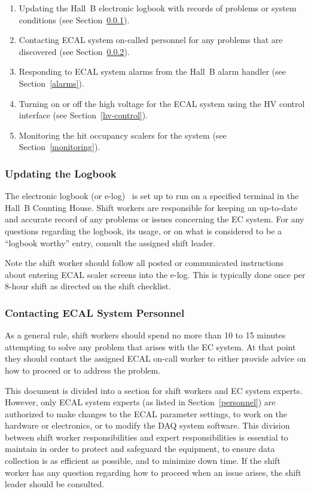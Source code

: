 \documentclass[letterpaper,10pt]{article}
\begin{document}
\begin{enumerate}
\item Updating the Hall~B electronic logbook with records of problems or system conditions (see 
Section~\ref{logbook}).

\item Contacting ECAL system on-called personnel for any problems that are discovered (see 
Section~\ref{contact}).

\item Responding to ECAL system alarms from the Hall~B alarm handler (see Section~\ref{alarms}).

\item Turning on or off the high voltage for the ECAL system using the HV control interface (see 
Section~\ref{hv-control}).

\item Monitoring the hit occupancy scalers for the system (see Section~\ref{monitoring}).
\end{enumerate}

\subsubsection{Updating the Logbook}
\label{logbook}

The electronic logbook (or e-log)~\cite{e-log} is set up to run on a specified terminal in the 
Hall~B Counting House. Shift workers are responsible for keeping an up-to-date and accurate record
of any problems or issues concerning the EC system. For any questions regarding the logbook, its
usage, or on what is considered to be a ``logbook worthy'' entry, consult the assigned shift leader.

Note the shift worker should follow all posted or communicated instructions about entering ECAL
scaler screens into the e-log. This is typically done once per 8-hour shift as directed on the
shift checklist.

\subsubsection{Contacting ECAL System Personnel}
\label{contact}

As a general rule, shift workers should spend no more than 10 to 15 minutes attempting to solve
any problem that arises with the EC system. At that point they should contact the assigned 
ECAL on-call worker to either provide advice on how to proceed or to address the problem.

This document is divided into a section for shift workers and EC system experts. However, only 
ECAL system experts (as listed in Section~\ref{personnel}) are authorized to make changes to the ECAL
parameter settings, to work on the hardware or electronics, or to modify the DAQ system 
software. This division between shift worker responsibilities and expert responsibilities is
essential to maintain in order to protect and safeguard the equipment, to ensure data collection
is as efficient as possible, and to minimize down time. If the shift worker has any question 
regarding how to proceed when an issue arises, the shift leader should be consulted.
\end{document}

